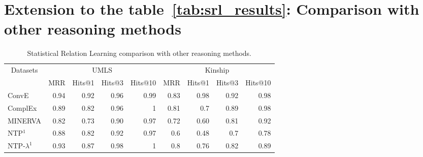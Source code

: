 \documentclass{article}
\begin{document}
\section{Extension to the table~\ref{tab:srl_results}: Comparison with other reasoning methods}

\begin{table}[!h]
\centering
\caption{Statistical Relation Learning comparison with other reasoning methods.}
\begin{tabular}{lrrrrrrrr} 
\toprule
\multicolumn{1}{c}{\multirow{2}{*}{Datasets}} & \multicolumn{4}{c}{UMLS}                                                                                        & \multicolumn{4}{c}{Kinship}                                                                                      \\
\multicolumn{1}{c}{}                          & \multicolumn{1}{c}{MRR} & \multicolumn{1}{c}{Hits@1} & \multicolumn{1}{c}{Hits@3} & \multicolumn{1}{c}{Hits@10} & \multicolumn{1}{c}{MRR} & \multicolumn{1}{c}{Hits@1} & \multicolumn{1}{c}{Hits@3} & \multicolumn{1}{c}{Hits@10}  \\ 
\hline
ConvE                                         & 0.94                    & 0.92                       & 0.96                       & 0.99                        & 0.83                    & 0.98                       & 0.92                       & 0.98                         \\
ComplEx                                       & 0.89                    & 0.82                       & 0.96                       & 1                           & 0.81                    & 0.7                        & 0.89                       & 0.98                         \\
MINERVA                                       & 0.82                    & 0.73                       &  0.90                       & 0.97                        &  0.72                    &  0.60                       & 0.81                       &  0.92                         \\
\hline
NTP$^1$                                           & 0.88                    & 0.82                       & 0.92                       & 0.97                        & 0.6                     & 0.48                       & 0.7                        & 0.78                         \\
NTP-$\lambda^1$                    & 0.93                    & 0.87                       & 0.98                       & 1                           & 0.8                     & 0.76                       & 0.82                       & 0.89                         \\

\end{tabular}
\end{table}
\end{document}
